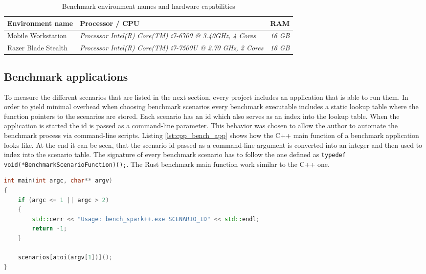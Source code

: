 \begin{table}[h!]
	\centering
	\label{my-label}
	\begin{tabular}{|l|l|l|}
		\hline
		\textbf{Environment name} & \textbf{Processor / CPU} & \textbf{RAM} \\ \hline
		Mobile Workstation	& \textit{Processor	Intel(R) Core(TM) i7-6700 @ 3.40GHz, 4 Cores} & \textit{16 GB} \\ \hline
		Razer Blade Stealth	& \textit{Processor	Intel(R) Core(TM) i7-7500U @ 2.70 GHz, 2 Cores} & \textit{16 GB} \\ \hline
	\end{tabular}
	\caption{Benchmark environment names and hardware capabilities}
\end{table}

\subsection{Benchmark applications}

To measure the different scenarios that are listed in the next section, every project includes an application that is able to run them. In order to yield minimal overhead when choosing benchmark scenarios every benchmark executable includes a static lookup table where the function pointers to the scenarios are stored. Each scenario has an id which also serves as an index into the lookup table. When the application is started the id is passed as a command-line parameter. This behavior was chosen to allow the author to automate the benchmark process via command-line scripts. Listing \ref{lst:cpp_bench_app} shows how the C++ main function of a benchmark application looks like. At the end it can be seen, that the scenario id passed as a command-line argument is converted into an integer and then used to index into the scenario table. The signature of every benchmark scenario has to follow the one defined as \texttt{typedef void(*BenchmarkScenarioFunction)();}. The Rust benchmark main function work similar to the C++ one.\\

\begin{lstlisting}[caption={Main function of the C++ benchmark app using a scenario lookup table}, label={lst:cpp_bench_app}, language={C++}]
int main(int argc, char** argv)
{
	if (argc <= 1 || argc > 2)
	{
		std::cerr << "Usage: bench_spark++.exe SCENARIO_ID" << std::endl;
		return -1;
	}
	
	scenarios[atoi(argv[1])]();
}
\end{lstlisting}


